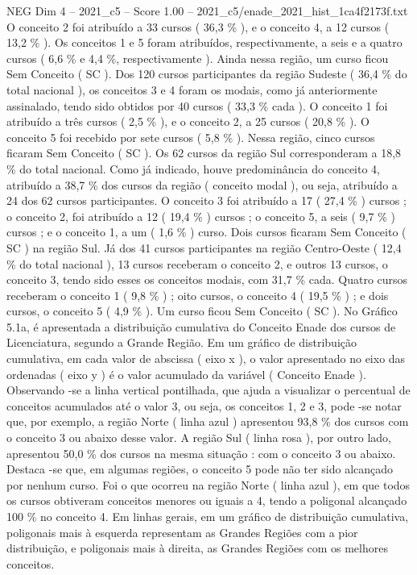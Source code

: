 \begin{textsample}{NEG Dim 4 – 2021\_c5 – Score 1.00 – 2021\_c5/enade\_2021\_hist\_1ca4f2173f.txt}
O conceito 2 foi atribuído a 33 cursos ( 36,3 \% ), e o conceito 4, a 12 cursos ( 13,2 \% ).
Os conceitos 1 e 5 foram atribuídos, respectivamente, a seis e a quatro cursos ( 6,6 \% e 4,4 \%, respectivamente ).
Ainda nessa região, um curso ficou Sem Conceito ( SC ).
Dos 120 cursos participantes da região Sudeste ( 36,4 \% do total nacional ), os conceitos 3 e 4 foram os modais, como já anteriormente assinalado, tendo sido obtidos por 40 cursos ( 33,3 \% cada ).
O conceito 1 foi atribuído a três cursos ( 2,5 \% ), e o conceito 2, a 25 cursos ( 20,8 \% ).
O conceito 5 foi recebido por sete cursos ( 5,8 \% ).
Nessa região, cinco cursos ficaram Sem Conceito ( SC ).
Os 62 cursos da região Sul corresponderam a 18,8 \% do total nacional.
Como já indicado, houve predominância do conceito 4, atribuído a 38,7 \% dos cursos da região ( conceito modal ), ou seja, atribuído a 24 dos 62 cursos participantes.
O conceito 3 foi atribuído a 17 ( 27,4 \% ) cursos ; o conceito 2, foi atribuído a 12 ( 19,4 \% ) cursos ; o conceito 5, a seis ( 9,7 \% ) cursos ; e o conceito 1, a um ( 1,6 \% ) curso.
Dois cursos ficaram Sem Conceito ( SC ) na região Sul.
Já dos 41 cursos participantes na região Centro-Oeste ( 12,4 \% do total nacional ), 13 cursos receberam o conceito 2, e outros 13 cursos, o conceito 3, tendo sido esses os conceitos modais, com 31,7 \% cada.
Quatro cursos receberam o conceito 1 ( 9,8 \% ) ; oito cursos, o conceito 4 ( 19,5 \% ) ; e dois cursos, o conceito 5 ( 4,9 \% ).
Um curso ficou Sem Conceito ( SC ).
No Gráfico 5.1a, é apresentada a distribuição cumulativa do Conceito Enade dos cursos de Licenciatura, segundo a Grande Região.
Em um gráfico de distribuição cumulativa, em cada valor de abscissa ( eixo x ), o valor apresentado no eixo das ordenadas ( eixo y ) é o valor acumulado da variável ( Conceito Enade ).
Observando -se a linha vertical pontilhada, que ajuda a visualizar o percentual de conceitos acumulados até o valor 3, ou seja, os conceitos 1, 2 e 3, pode -se notar que, por exemplo, a região Norte ( linha azul ) apresentou 93,8 \% dos cursos com o conceito 3 ou abaixo desse valor.
A região Sul ( linha rosa ), por outro lado, apresentou 50,0 \% dos cursos na mesma situação : com o conceito 3 ou abaixo.
Destaca -se que, em algumas regiões, o conceito 5 pode não ter sido alcançado por nenhum curso.
Foi o que ocorreu na região Norte ( linha azul ), em que todos os cursos obtiveram conceitos menores ou iguais a 4, tendo a poligonal alcançado 100 \% no conceito 4.
Em linhas gerais, em um gráfico de distribuição cumulativa, poligonais mais à esquerda representam as Grandes Regiões com a pior distribuição, e poligonais mais à direita, as Grandes Regiões com os melhores conceitos.

\end{textsample}
